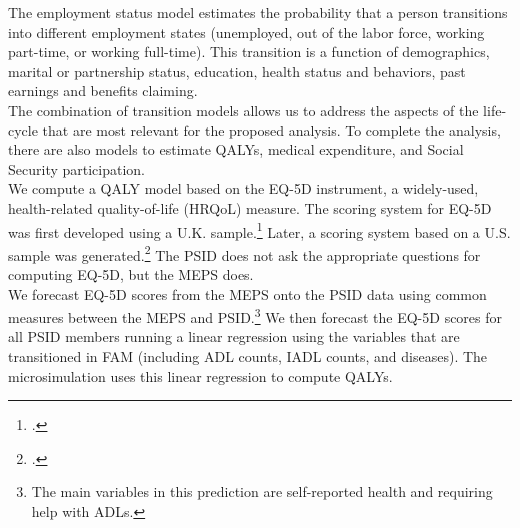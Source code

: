 \noindent The employment status model estimates the probability that a person transitions into different employment states (unemployed, out of the labor force, working part-time, or working full-time). This transition is a function of demographics, marital or partnership status, education, health status and behaviors, past earnings and benefits claiming. \\



\noindent The combination of transition models allows us to address the aspects of the life-cycle that are most relevant for the proposed analysis. To complete the analysis, there are also models to estimate QALYs, medical expenditure, and Social Security participation. \\

\noindent We compute a QALY model based on the EQ-5D instrument, a widely-used, health-related
quality-of-life (HRQoL) measure. %
The scoring system for EQ-5D was first developed using a U.K. sample.\footnote{\citet{Dolan_1997_Modeling_MC}.} Later, a scoring system based on
a U.S. sample was generated.\footnote{\citet{Shaw_etal_2005_EQ5D_MC}.} The PSID does not ask the appropriate questions for computing EQ-5D, but the MEPS does. \\

\noindent We forecast EQ-5D scores from the MEPS onto the PSID data using common measures between the MEPS and PSID.\footnote{The main variables in this prediction are self-reported health and requiring help with ADLs.} We then forecast the EQ-5D scores for all PSID members running a linear regression using the variables that are transitioned in FAM (including ADL counts, IADL counts, and diseases). The microsimulation uses this linear regression to compute QALYs. \\
%



